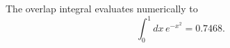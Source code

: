 \documentclass{article}
\begin{document}
The overlap integral evaluates numerically to
\begin{equation}
\int_0^{1} dx\, e^{-x^2} = 0.7468 .
\label{eq:num}
\end{equation}
\end{document}
